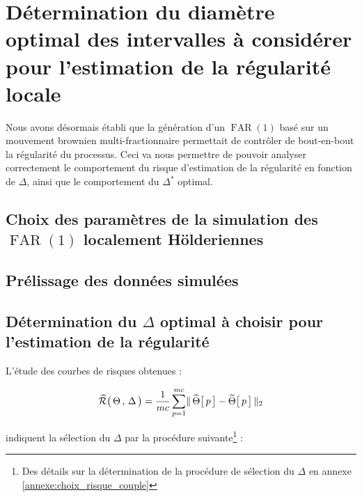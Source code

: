 \chapter{Détermination du diamètre optimal des intervalles à considérer pour l'estimation de la régularité locale }
\minitoc%


Nous avons désormais établi que la génération d'un $\operatorname{FAR}(1)$ basé sur un mouvement brownien multi-fractionnaire permettait de contrôler de bout-en-bout la régularité du processus. Ceci va nous permettre de pouvoir analyser correctement le comportement du risque d'estimation de la régularité en fonction de $\Delta$, ainsi que le comportement du $\Delta^*$ optimal.

\section{Choix des paramètres de la simulation des $\operatorname{FAR}(1)$ localement Hölderiennes}



\section{Prélissage des données simulées}




% 
% 
% 
\section{Détermination du $\Delta$ optimal à choisir pour l'estimation de la régularité}

\noindent L'étude des courbes de risques obtenues :

\begin{equation*}
	\widehat{\mathcal R} \bigl( \, \Theta \, , \, \Delta \, \bigr) = \frac 1 {mc} \sum\limits_{p=1}^{mc} \distnorme 2 {\widehat \Theta\bigl[\, p \,\bigr]} {\widetilde \Theta \bigl[ \,p \,\bigr]}
\end{equation*}

indiquent la sélection du $\Delta$ par la procédure suivante\footnote{Des détails sur la détermination de la procédure de sélection du $\Delta$ en annexe \ref{annexe:choix_risque_couple}} :
